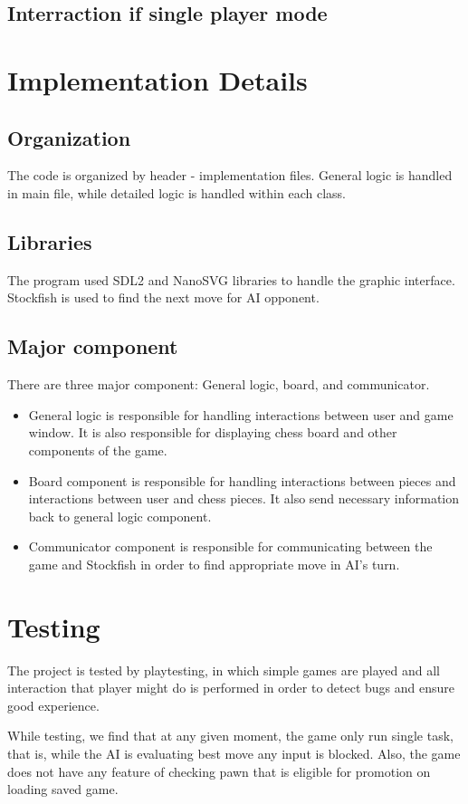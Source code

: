 \documentclass[a4paper, 10pt, titlepage]{report}
\begin{document}
\section{Interraction if single player mode}




\chapter{Implementation Details}
\section{Organization}
The code is organized by header - implementation files. General logic is handled in main file, while detailed logic is handled within each class.
\section{Libraries}
The program used SDL2 and NanoSVG libraries to handle the graphic interface. Stockfish is used to find the next move for AI opponent.
\section{Major component}
There are three major component: General logic, board, and communicator.
\begin{itemize}
  \item General logic is responsible for handling interactions between user and game window. It is also responsible for displaying chess board and other components of the game.
  \item Board component is responsible for handling interactions between pieces and interactions between user and chess pieces. It also send necessary information back to general logic component.
  \item Communicator component is responsible for communicating between the game and Stockfish in order to find appropriate move in AI's turn.
\end{itemize}
\chapter{Testing}

The project is tested by playtesting, in which simple games are played and all interaction that player might do is performed in order to detect bugs and ensure good experience.

While testing, we find that at any given moment, the game only run single task, that is, while the AI is evaluating best move any input is blocked. Also, the game does not have any feature of checking pawn that is eligible for promotion on loading saved game.
\end{document}
